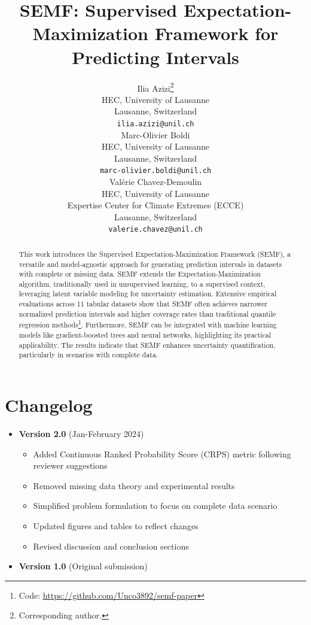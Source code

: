 \documentclass{article}
\title{SEMF: Supervised Expectation-Maximization Framework for Predicting Intervals}
\author{%
  Ilia Azizi\thanks{Corresponding author.} \\
  HEC, University of Lausanne\\
  Lausanne, Switzerland \\
  \texttt{ilia.azizi@unil.ch} \\
  \And
  Marc-Olivier Boldi \\
  HEC, University of Lausanne\\
  Lausanne, Switzerland \\
  \texttt{marc-olivier.boldi@unil.ch} \\
  \And
  Valérie Chavez-Demoulin \\
  HEC, University of Lausanne\\
  Expertise Center for Climate Extremes (ECCE) \\
  Lausanne, Switzerland \\
  \texttt{valerie.chavez@unil.ch} \\
}
\begin{document}
\maketitle

\begin{abstract}
\setcounter{footnote}{0} %
This work introduces the Supervised Expectation-Maximization Framework (SEMF), a versatile and model-agnostic approach for generating prediction intervals in datasets with complete or missing data. SEMF extends the Expectation-Maximization algorithm, traditionally used in unsupervised learning, to a supervised context, leveraging latent variable modeling for uncertainty estimation. Extensive empirical evaluations across 11 tabular datasets show that SEMF often achieves narrower normalized prediction intervals and higher coverage rates than traditional quantile regression methods\footnote{Code: \url{https://github.com/Unco3892/semf-paper}}. Furthermore, SEMF can be integrated with machine learning models like gradient-boosted trees and neural networks, highlighting its practical applicability. The results indicate that SEMF enhances uncertainty quantification, particularly in scenarios with complete data.
\end{abstract}

\section*{Changelog}
\begin{itemize}
    \item \textbf{Version 2.0} (Jan-February 2024)
    \begin{itemize}
        \item Added Continuous Ranked Probability Score (CRPS) metric following reviewer suggestions
        \item Removed missing data theory and experimental results
        \item Simplified problem formulation to focus on complete data scenario
        \item Updated figures and tables to reflect changes
        \item Revised discussion and conclusion sections
    \end{itemize}
    \item \textbf{Version 1.0} (Original submission)
\end{itemize}
\end{document}
